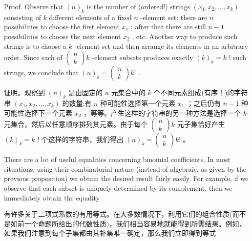 \documentclass[10pt]{article}
\begin{document}
Proof. Observe that \({\left( n\right) }_{k}\) is the number of (ordered!) strings \(\left( {{x}_{1},{x}_{2},\ldots ,{x}_{k}}\right)\) consisting of \(k\) different elements of a fixed \(n\) -element set: there are \(n\) possibilities to choose the first element \({x}_{1}\) ; after that there are still \(n - 1\) possibilities to choose the next element \({x}_{2}\) , etc. Another way to produce such strings is to choose a \(k\) -element set and then arrange its elements in an arbitrary order. Since each of \(\left( \begin{array}{l} n \\  k \end{array}\right) k\) -element subsets produces exactly \({\left( k\right) }_{k} = k\) ! such strings, we conclude that \({\left( n\right) }_{k} = \left( \begin{array}{l} n \\  k \end{array}\right) k!\) .

\begin{tcolorbox}\relax
证明。观察到 \({\left( n\right) }_{k}\) 是由固定的 \(n\) 元集合中的 \(k\) 个不同元素组成(有序！)的字符串 \(\left( {{x}_{1},{x}_{2},\ldots ,{x}_{k}}\right)\) 的数量:有 \(n\) 种可能性选择第一个元素 \({x}_{1}\) ；之后仍有 \(n - 1\) 种可能性选择下一个元素 \({x}_{2}\) ，等等。产生这样的字符串的另一种方法是选择一个 \(k\) 元集合，然后以任意顺序排列其元素。由于每个 \(\left( \begin{array}{l} n \\  k \end{array}\right) k\) 元子集恰好产生 \({\left( k\right) }_{k} = k\) ! 个这样的字符串，我们得出 \({\left( n\right) }_{k} = \left( \begin{array}{l} n \\  k \end{array}\right) k!\) 。
\end{tcolorbox}

There are a lot of useful equalities concerning binomial coefficients. In most situations, using their combinatorial nature (instead of algebraic, as given by the previous proposition) we obtain the desired result fairly easily. For example, if we observe that each subset is uniquely determined by its complement, then we immediately obtain the equality

\begin{tcolorbox}\relax
有许多关于二项式系数的有用等式。在大多数情况下，利用它们的组合性质(而不是如前一个命题所给出的代数性质)，我们相当容易地就能得到所需结果。例如，如果我们注意到每个子集都由其补集唯一确定，那么我们立即得到等式
\end{tcolorbox}
\end{document}
